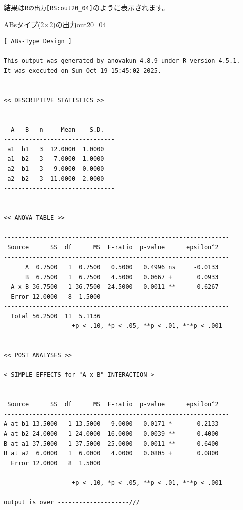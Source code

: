 \documentclass{ltjbook}
\begin{document}
結果は\texttt{Rの出力\ref{RS:out20_04}}のように表示されます。
\begin{Rscreen}{ABsタイプ(2$\times$2)の出力}{out20_04}
	\begin{verbatim}
[ ABs-Type Design ]

This output was generated by anovakun 4.8.9 under R version 4.5.1.
It was executed on Sun Oct 19 15:45:02 2025.

 
<< DESCRIPTIVE STATISTICS >>

-------------------------------
  A   B   n     Mean    S.D. 
-------------------------------
 a1  b1   3  12.0000  1.0000 
 a1  b2   3   7.0000  1.0000 
 a2  b1   3   9.0000  0.0000 
 a2  b2   3  11.0000  2.0000 
-------------------------------


<< ANOVA TABLE >>

---------------------------------------------------------------
 Source      SS  df      MS  F-ratio  p-value      epsilon^2 
---------------------------------------------------------------
      A  0.7500   1  0.7500   0.5000   0.4996 ns     -0.0133 
      B  6.7500   1  6.7500   4.5000   0.0667 +       0.0933 
  A x B 36.7500   1 36.7500  24.5000   0.0011 **      0.6267 
  Error 12.0000   8  1.5000                                  
---------------------------------------------------------------
  Total 56.2500  11  5.1136                                  
                   +p < .10, *p < .05, **p < .01, ***p < .001


<< POST ANALYSES >>

< SIMPLE EFFECTS for "A x B" INTERACTION >

---------------------------------------------------------------
 Source      SS  df      MS  F-ratio  p-value      epsilon^2 
---------------------------------------------------------------
A at b1 13.5000   1 13.5000   9.0000   0.0171 *       0.2133 
A at b2 24.0000   1 24.0000  16.0000   0.0039 **      0.4000 
B at a1 37.5000   1 37.5000  25.0000   0.0011 **      0.6400 
B at a2  6.0000   1  6.0000   4.0000   0.0805 +       0.0800 
  Error 12.0000   8  1.5000                                  
---------------------------------------------------------------
                   +p < .10, *p < .05, **p < .01, ***p < .001

output is over --------------------///
\end{verbatim}
\end{Rscreen}
\end{document}
